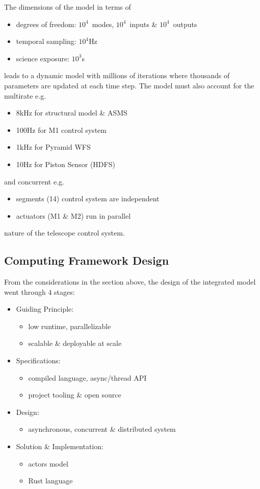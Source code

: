 \documentclass[]{AO4ELT}  %
\begin{document}
The dimensions of the model in terms of
\begin{itemize}
   \item degrees of freedom: $10^4$~modes, $10^4$~inputs \& $10^4$~outputs
   \item temporal sampling: $10^4$Hz
   \item science exposure: $10^3$s
\end{itemize}
leads to a dynamic model with millions of iterations where thousands of parameters are updated at each time step.
The model must also account for the multirate e.g.
\begin{itemize}
   \item 8kHz for structural model \& ASMS
   \item 100Hz for M1 control system
   \item 1kHz for Pyramid WFS
   \item 10Hz for Piston Sensor (HDFS)
\end{itemize}
and concurrent e.g.
\begin{itemize}
   \item segments (14) control system are independent
   \item actuators (M1 \& M2) run in parallel
\end{itemize}
nature of the telescope control system.

\subsection{Computing Framework Design}
\label{sec:framework-design}

From the considerations in the section above, the design of the integrated model
went through 4 stages:
\begin{itemize}
   \item Guiding Principle:
         \begin{itemize}
            \item low runtime, parallelizable
            \item scalable \& deployable at scale
         \end{itemize}
   \item Specifications:
         \begin{itemize}
            \item compiled language, async/thread API
            \item project tooling \& open source
         \end{itemize}
   \item Design:
         \begin{itemize}
            \item asynchronous, concurrent
                  \& distributed system
         \end{itemize}
   \item Solution \& Implementation:
         \begin{itemize}
            \item actors model
            \item Rust language
         \end{itemize}
\end{itemize}
\end{document}
